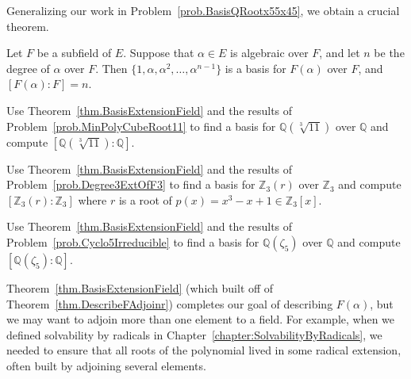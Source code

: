 Generalizing our work in Problem~\ref{prob.BasisQRootx55x45}, we obtain a crucial theorem.

\begin{theorem}\label{thm.BasisExtensionField}
Let $F$ be a subfield of $E$. Suppose that $\alpha\in E$ is algebraic over $F$, and let $n$ be the degree of $\alpha$ over $F$. Then $\{1,\alpha,\alpha^2,\ldots,\alpha^{n-1}\}$ is a basis for $F(\alpha)$ over $F$, and $[F(\alpha):F] = n$. 
\end{theorem}

\begin{problem}\label{prob.BasisForQAdjoinCubeRoot11}
Use Theorem~\ref{thm.BasisExtensionField} and the results of Problem~\ref{prob.MinPolyCubeRoot11} to find a basis for $\mathbb{Q}(\sqrt[3]{11})$ over $\mathbb{Q}$ and compute $[\mathbb{Q}(\sqrt[3]{11}):\mathbb{Q}]$.
\end{problem}

\begin{problem}
Use Theorem~\ref{thm.BasisExtensionField} and the results of Problem~\ref{prob.Degree3ExtOfF3} to find a basis for $\mathbb{Z}_3(r)$ over $\mathbb{Z}_3$ and compute $[\mathbb{Z}_3(r):\mathbb{Z}_3]$ where $r$ is a root of $p(x) = x^3-x+1 \in \mathbb{Z}_3[x]$.
\end{problem}

\begin{problem}
Use Theorem~\ref{thm.BasisExtensionField} and the results of Problem~\ref{prob.Cyclo5Irreducible} to find a basis for $\mathbb{Q}(\zeta_5)$ over $\mathbb{Q}$ and compute $[\mathbb{Q}(\zeta_5):\mathbb{Q}]$.
\end{problem}

Theorem~\ref{thm.BasisExtensionField} (which built off of Theorem~\ref{thm.DescribeFAdjoinr}) completes our goal of describing $F(\alpha)$, but we may want to adjoin more than one element to a field. For example, when we defined solvability by radicals in Chapter~\ref{chapter:SolvabilityByRadicals}, we needed to ensure that all roots of the polynomial lived in some radical extension, often built by adjoining several elements. 

